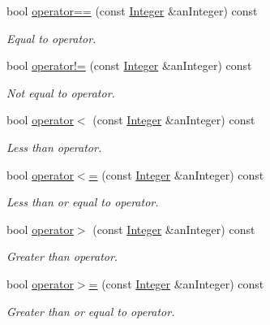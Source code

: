 \begin{DoxyCompactItemize}
bool \hyperlink{classlibrary_1_1core_1_1types_1_1_integer_a52b3a012d6c6779773d051800daac516}{operator==} (const \hyperlink{classlibrary_1_1core_1_1types_1_1_integer}{Integer} \&an\+Integer) const
\begin{DoxyCompactList}\small\item\em Equal to operator. \end{DoxyCompactList}\item 
bool \hyperlink{classlibrary_1_1core_1_1types_1_1_integer_a9145ffb6bca8771f06a3403056466d53}{operator!=} (const \hyperlink{classlibrary_1_1core_1_1types_1_1_integer}{Integer} \&an\+Integer) const
\begin{DoxyCompactList}\small\item\em Not equal to operator. \end{DoxyCompactList}\item 
bool \hyperlink{classlibrary_1_1core_1_1types_1_1_integer_a7f179765edbdeb186cde5e869021ccb6}{operator$<$} (const \hyperlink{classlibrary_1_1core_1_1types_1_1_integer}{Integer} \&an\+Integer) const
\begin{DoxyCompactList}\small\item\em Less than operator. \end{DoxyCompactList}\item 
bool \hyperlink{classlibrary_1_1core_1_1types_1_1_integer_a57c084e8ca66e33675a706868b555962}{operator$<$=} (const \hyperlink{classlibrary_1_1core_1_1types_1_1_integer}{Integer} \&an\+Integer) const
\begin{DoxyCompactList}\small\item\em Less than or equal to operator. \end{DoxyCompactList}\item 
bool \hyperlink{classlibrary_1_1core_1_1types_1_1_integer_aa5e59aba88550137a1b120e90ab155fa}{operator$>$} (const \hyperlink{classlibrary_1_1core_1_1types_1_1_integer}{Integer} \&an\+Integer) const
\begin{DoxyCompactList}\small\item\em Greater than operator. \end{DoxyCompactList}\item 
bool \hyperlink{classlibrary_1_1core_1_1types_1_1_integer_ae565ce34bef391725beebb42269d26fe}{operator$>$=} (const \hyperlink{classlibrary_1_1core_1_1types_1_1_integer}{Integer} \&an\+Integer) const
\begin{DoxyCompactList}\small\item\em Greater than or equal to operator. \end{DoxyCompactList}\item 

\end{DoxyCompactItemize}
